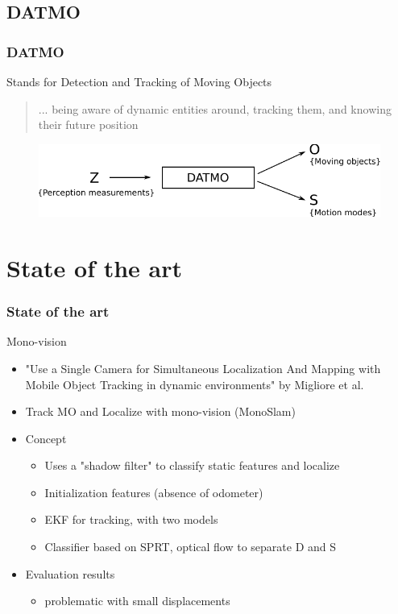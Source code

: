\documentclass{beamer}
\begin{document}
	\subsection{DATMO}
		\begin{frame}
			\frametitle{DATMO}
			\begin{block}{Stands for}				
				Detection and Tracking of Moving Objects
			\end{block}
			\begin{quotation}
				... being aware of dynamic entities around, tracking them, and knowing their future position \cite{DBLP:journals/inffus/VuBA11}
			\end{quotation}				
			\begin{figure}[h]
				\center
				\includegraphics[scale=0.8]{../img/fig:datmo:process}
			 \end{figure}		
		\end{frame}


\section{State of the art}

	\begin{frame}
		\frametitle{State of the art}
		
		\begin{block}{Mono-vision}
			\begin{itemize}
			\item "Use a Single Camera for Simultaneous Localization And Mapping with  Mobile Object Tracking in dynamic environments" by Migliore et al.
			\item Track MO and Localize with mono-vision (MonoSlam)
			\item Concept
				\begin{itemize}			
				\item Uses a "shadow filter" to classify static features and localize
				\item Initialization features (absence of odometer)
				\item EKF for tracking, with two models
				\item Classifier based on SPRT, optical flow to separate D and S				
				\end{itemize}		
			\item Evaluation results
				\begin{itemize}			
				\item problematic with small displacements
				\end{itemize}	
			\end{itemize}		
		\end{block}
	\end{frame}
	
\end{document}
